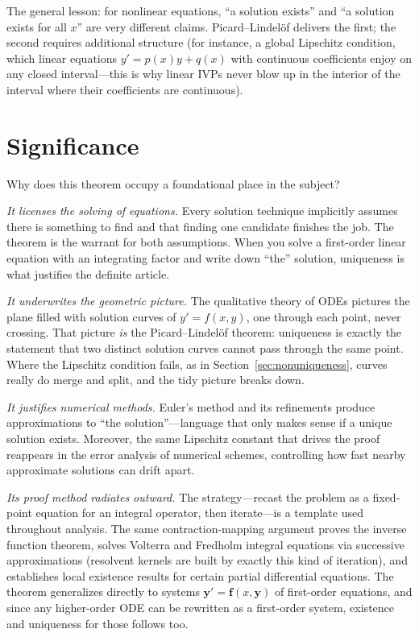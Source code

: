 \documentclass{essay}
\begin{document}
The general lesson: for nonlinear equations, ``a solution exists'' and ``a solution exists for all $x$'' are very different claims. Picard--Lindel\"of delivers the first; the second requires additional structure (for instance, a global Lipschitz condition, which linear equations $y' = p(x)y + q(x)$ with continuous coefficients enjoy on any closed interval---this is why linear IVPs never blow up in the interior of the interval where their coefficients are continuous).

\section{Significance}

Why does this theorem occupy a foundational place in the subject?

\emph{It licenses the solving of equations.} Every solution technique implicitly assumes there is something to find and that finding one candidate finishes the job. The theorem is the warrant for both assumptions. When you solve a first-order linear equation with an integrating factor and write down ``the'' solution, uniqueness is what justifies the definite article.

\emph{It underwrites the geometric picture.} The qualitative theory of ODEs pictures the plane filled with solution curves of $y' = f(x,y)$, one through each point, never crossing. That picture \emph{is} the Picard--Lindel\"of theorem: uniqueness is exactly the statement that two distinct solution curves cannot pass through the same point. Where the Lipschitz condition fails, as in Section~\ref{sec:nonuniqueness}, curves really do merge and split, and the tidy picture breaks down.

\emph{It justifies numerical methods.} Euler's method and its refinements produce approximations to ``the solution''---language that only makes sense if a unique solution exists. Moreover, the same Lipschitz constant that drives the proof reappears in the error analysis of numerical schemes, controlling how fast nearby approximate solutions can drift apart.

\emph{Its proof method radiates outward.} The strategy---recast the problem as a fixed-point equation for an integral operator, then iterate---is a template used throughout analysis. The same contraction-mapping argument proves the inverse function theorem, solves Volterra and Fredholm integral equations via successive approximations (resolvent kernels are built by exactly this kind of iteration), and establishes local existence results for certain partial differential equations. The theorem generalizes directly to systems $\mathbf{y}' = \mathbf{f}(x, \mathbf{y})$ of first-order equations, and since any higher-order ODE can be rewritten as a first-order system, existence and uniqueness for those follows too.
\end{document}
